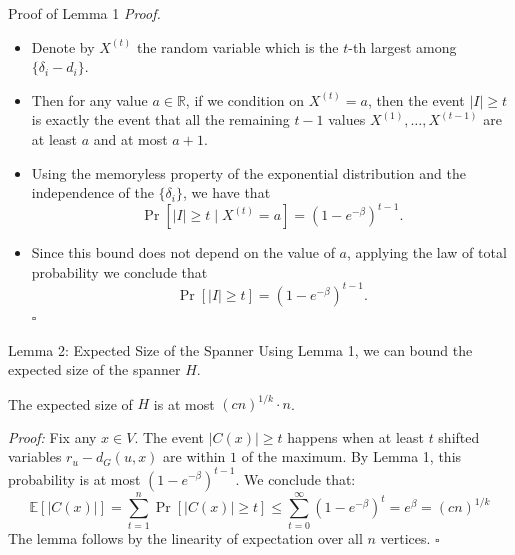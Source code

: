 \documentclass{beamer}
\begin{document}
\begin{frame}{Proof of Lemma 1}
    \textit{Proof.}
    \vspace{0.2cm}
    \begin{itemize}
        \item Denote by $X^{(t)}$ the random variable which is the $t$-th largest among $\{\delta_i - d_i\}$.
        \item Then for any value $a \in \mathbb{R}$, if we condition on $X^{(t)} = a$, then the event $|I| \ge t$ is exactly the event that all the remaining $t - 1$ values $X^{(1)}, \dots, X^{(t-1)}$ are at least $a$ and at most $a + 1$.
        \item Using the memoryless property of the exponential distribution and the independence of the $\{\delta_i\}$, we have that
        \[ \Pr[|I| \ge t \mid X^{(t)} = a] = (1 - e^{-\beta})^{t-1} .\]
        \item Since this bound does not depend on the value of $a$, applying the law of total probability we conclude that
        \[ \Pr[|I| \ge t] = (1 - e^{-\beta})^{t-1} .\] \hfill $\square$
    \end{itemize}
\end{frame}

\begin{frame}{Lemma 2: Expected Size of the Spanner}
    Using Lemma 1, we can bound the expected size of the spanner $H$.
    
    \vspace{0.3cm}
    \begin{lemma}[2]
        The expected size of $H$ is at most $(cn)^{1/k} \cdot n$.
    \end{lemma}
    
    \vspace{0.3cm}
    \small
    \textit{Proof:} Fix any $x \in V$. The event $|C(x)| \ge t$ happens when at least $t$ shifted variables $r_u - d_G(u,x)$ are within $1$ of the maximum. By Lemma 1, this probability is at most $(1 - e^{-\beta})^{t-1}$. We conclude that:
    \[ \mathbb{E}[|C(x)|] = \sum_{t=1}^n \Pr[|C(x)| \ge t] \le \sum_{t=0}^\infty (1 - e^{-\beta})^t = e^\beta = (cn)^{1/k} \]
    The lemma follows by the linearity of expectation over all $n$ vertices. \hfill $\square$
\end{frame}
\end{document}
